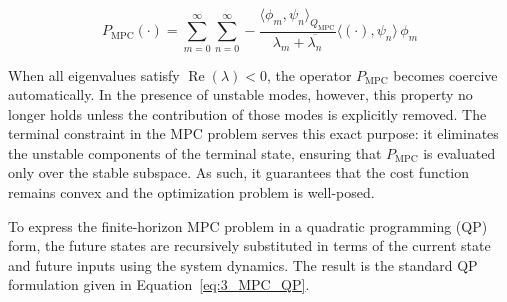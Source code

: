 \begin{equation} \label{eq:3_P_MPC}
P_{\mathrm{MPC}} (\cdot) = \sum_{m=0}^\infty \sum_{n=0}^\infty 
    -\frac{
        \langle \phi_m , \psi_n \rangle_{Q_{\mathrm{MPC}}}
    }{
        \lambda_m + \overline{\lambda_n}
    }
    \langle (\cdot) , \psi_n \rangle \, \phi_m
\end{equation}

When all eigenvalues satisfy $\operatorname{Re}(\lambda) < 0$, the operator $P_{\mathrm{MPC}}$ becomes coercive automatically. In the presence of unstable modes, however, this property no longer holds unless the contribution of those modes is explicitly removed. The terminal constraint in the MPC problem serves this exact purpose: it eliminates the unstable components of the terminal state, ensuring that $P_{\mathrm{MPC}}$ is evaluated only over the stable subspace. As such, it guarantees that the cost function remains convex and the optimization problem is well-posed\autocite{Curtain2020Introduction, xu2017linear}.

To express the finite-horizon MPC problem in a quadratic programming (QP) form, the future states are recursively substituted in terms of the current state and future inputs using the system dynamics. The result is the standard QP formulation given in Equation~\ref{eq:3_MPC_QP}.

